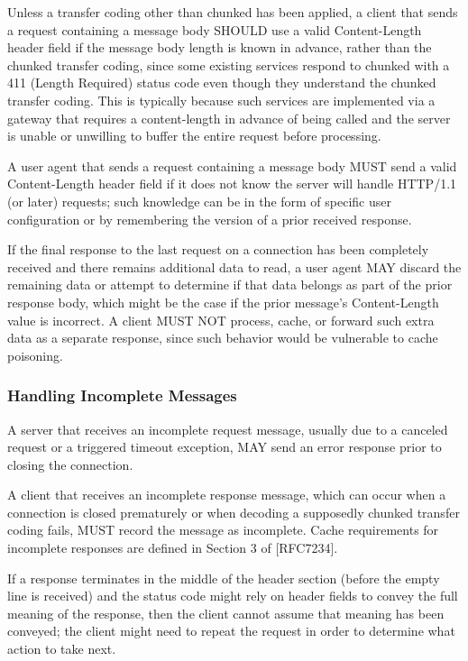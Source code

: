 Unless a transfer coding other than chunked has been applied, a
client that sends a request containing a message body SHOULD use a
valid Content-Length header field if the message body length is known
in advance, rather than the chunked transfer coding, since some
existing services respond to chunked with a 411 (Length Required)
status code even though they understand the chunked transfer coding.
This is typically because such services are implemented via a gateway
that requires a content-length in advance of being called and the
server is unable or unwilling to buffer the entire request before
processing.

A user agent that sends a request containing a message body MUST send
a valid Content-Length header field if it does not know the server
will handle HTTP/1.1 (or later) requests; such knowledge can be in
the form of specific user configuration or by remembering the version
of a prior received response.

If the final response to the last request on a connection has been
completely received and there remains additional data to read, a user
agent MAY discard the remaining data or attempt to determine if that
data belongs as part of the prior response body, which might be the
case if the prior message's Content-Length value is incorrect.  A
client MUST NOT process, cache, or forward such extra data as a
separate response, since such behavior would be vulnerable to cache
poisoning.
\subsubsection{Handling Incomplete Messages}
A server that receives an incomplete request message, usually due to
   a canceled request or a triggered timeout exception, MAY send an
   error response prior to closing the connection.

   A client that receives an incomplete response message, which can
   occur when a connection is closed prematurely or when decoding a
   supposedly chunked transfer coding fails, MUST record the message as
   incomplete.  Cache requirements for incomplete responses are defined
   in Section 3 of [RFC7234].

   If a response terminates in the middle of the header section (before
   the empty line is received) and the status code might rely on header
   fields to convey the full meaning of the response, then the client
   cannot assume that meaning has been conveyed; the client might need
   to repeat the request in order to determine what action to take next.

